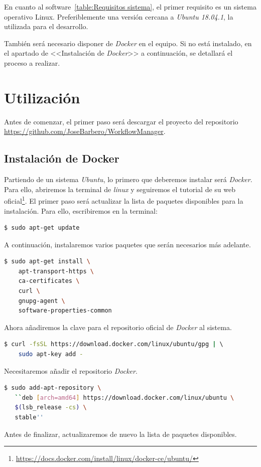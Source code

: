 En cuanto al software~\ref{table:Requisitos sistema}, el primer requisito es un sistema operativo Linux. Preferiblemente una versión cercana a \textit{Ubuntu 18.04.1}, la utilizada para el desarrollo.

También será necesario disponer de \textit{Docker} en el equipo. Si no está instalado, en el apartado de <<Instalación de \textit{Docker}>> a continuación, se detallará el proceso a realizar.

\section{Utilización}
Antes de comenzar, el primer paso será descargar el proyecto del repositorio \url{https://github.com/JoseBarbero/WorkflowManager}.
\subsection{Instalación de Docker}
Partiendo de un sistema \textit{Ubuntu}, lo primero que deberemos instalar será \textit{Docker}. Para ello, abriremos la terminal de \textit{linux} y seguiremos el tutorial de su web oficial\footnote{\url{https://docs.docker.com/install/linux/docker-ce/ubuntu/}}. El primer paso será actualizar la lista de paquetes disponibles para la instalación. Para ello, escribiremos en la terminal:
    \begin{lstlisting}[language=bash]
    $ sudo apt-get update
    \end{lstlisting}
A continuación, instalaremos varios paquetes que serán necesarios más adelante.
    \begin{lstlisting}[language=bash]
    $ sudo apt-get install \
    apt-transport-https \
    ca-certificates \
    curl \
    gnupg-agent \
    software-properties-common
    \end{lstlisting}
Ahora añadiremos la clave para el repositorio oficial de \textit{Docker} al sistema.
    \begin{lstlisting}[language=bash]
    $ curl -fsSL https://download.docker.com/linux/ubuntu/gpg | \ 
    sudo apt-key add -
    \end{lstlisting}
Necesitaremos añadir el repositorio \textit{Docker}.
    \begin{lstlisting}[language=bash]
    $ sudo add-apt-repository \
   ``deb [arch=amd64] https://download.docker.com/linux/ubuntu \
   $(lsb_release -cs) \
   stable''
    \end{lstlisting}
Antes de finalizar, actualizaremos de nuevo la lista de paquetes disponibles.
